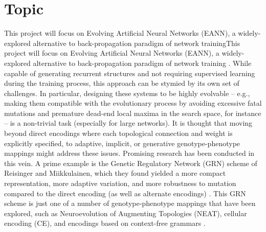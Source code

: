 \section{Topic}

 This project will focus on Evolving Artificial Neural Networks (EANN), a widely-explored alternative to back-propagation paradigm of network trainingThis project will focus on Evolving Artificial Neural Networks (EANN), a widely-explored alternative to back-propagation paradigm of network training \cite{DowningIntelligenceSystems}. While capable of generating recurrent structures and not requiring supervised learning during the training process, this approach can be stymied by its own set of challenges. In particular, designing these systems to be highly evolvable -- e.g., making them compatible with the evolutionary process by avoiding excessive fatal mutations and premature dead-end local maxima in the search space, for instance -- is a non-trivial task (especially for large networks). It is thought that moving beyond direct encodings where each topological connection and weight is explicitly specified, to adaptive, implicit, or generative genotype-phenotype mappings might address these issues. Promising research has been conducted in this vein. A prime example is the Genetic Regulatory Network (GRN) scheme of Reisinger and Miikkulainen, which they found yielded a more compact representation, more adaptive variation, and more robustness to mutation compared to the direct encoding (as well as alternate encodings) \cite{ReisingerAcquiringRepresentations}. This GRN scheme is just one of a number of genotype-phenotype mappings that have been explored, such as Neuroevolution of Augmenting Topologies (NEAT), cellular encoding (CE), and encodings based on context-free grammars \cite{DowningIntelligenceSystems}.
